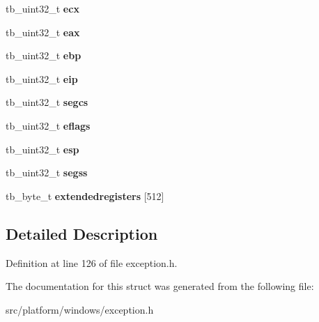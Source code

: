 \begin{DoxyCompactItemize}
\item 
\hypertarget{structtb__exception__context__t_a87c84bbe749d664c32592f6ea1ad10dc}{tb\-\_\-uint32\-\_\-t {\bfseries ecx}}\label{structtb__exception__context__t_a87c84bbe749d664c32592f6ea1ad10dc}

\item 
\hypertarget{structtb__exception__context__t_a2d15024f84ac543dcd9e2f5189759a22}{tb\-\_\-uint32\-\_\-t {\bfseries eax}}\label{structtb__exception__context__t_a2d15024f84ac543dcd9e2f5189759a22}

\item 
\hypertarget{structtb__exception__context__t_ab950a4d9801b5619bb24b48e426eab98}{tb\-\_\-uint32\-\_\-t {\bfseries ebp}}\label{structtb__exception__context__t_ab950a4d9801b5619bb24b48e426eab98}

\item 
\hypertarget{structtb__exception__context__t_a93d4a2ba97bce338aed63b8a3e234fc9}{tb\-\_\-uint32\-\_\-t {\bfseries eip}}\label{structtb__exception__context__t_a93d4a2ba97bce338aed63b8a3e234fc9}

\item 
\hypertarget{structtb__exception__context__t_a6e2802fbc3f548cb2b3c53480a8a7bf8}{tb\-\_\-uint32\-\_\-t {\bfseries segcs}}\label{structtb__exception__context__t_a6e2802fbc3f548cb2b3c53480a8a7bf8}

\item 
\hypertarget{structtb__exception__context__t_a711f7c28def5ad1be181f56e24c55fa4}{tb\-\_\-uint32\-\_\-t {\bfseries eflags}}\label{structtb__exception__context__t_a711f7c28def5ad1be181f56e24c55fa4}

\item 
\hypertarget{structtb__exception__context__t_a525a155f56fc238151c43f0dbfe37387}{tb\-\_\-uint32\-\_\-t {\bfseries esp}}\label{structtb__exception__context__t_a525a155f56fc238151c43f0dbfe37387}

\item 
\hypertarget{structtb__exception__context__t_a0cad9d4891b0b73e831351d5cadcf63b}{tb\-\_\-uint32\-\_\-t {\bfseries segss}}\label{structtb__exception__context__t_a0cad9d4891b0b73e831351d5cadcf63b}

\item 
\hypertarget{structtb__exception__context__t_a5b8295cae0cec4b3a5de0cc8c0dc3222}{tb\-\_\-byte\-\_\-t {\bfseries extendedregisters} \mbox{[}512\mbox{]}}\label{structtb__exception__context__t_a5b8295cae0cec4b3a5de0cc8c0dc3222}

\end{DoxyCompactItemize}


\subsection{Detailed Description}


Definition at line 126 of file exception.\-h.



The documentation for this struct was generated from the following file\-:\begin{DoxyCompactItemize}
\item 
src/platform/windows/exception.\-h\end{DoxyCompactItemize}
